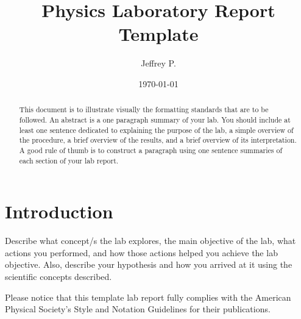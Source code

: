 \documentclass[
    10pt,aps,prl,
    amsfonts,
    amssymb,
    amsmath,
    runinaddress,
    secnum,
    showkeys,
    superscriptaddress,
    twocolumn,
]{revtex4}
\begin{document}

\title{Physics Laboratory Report Template}

\author{Jeffrey P. }


\date{\today}

%

\begin{abstract}
    This document is to illustrate visually the formatting standards that
        are to be followed.
    An abstract is a one paragraph summary of your lab.
    You should include at least one sentence dedicated to explaining
        the purpose of the lab, a simple overview of the procedure,
        a brief overview of the results, and a brief overview of
        its interpretation.
    A good rule of thumb is to construct a paragraph using one 
        sentence summaries of each section of your lab report.
\end{abstract}

\maketitle


\section{Introduction}
    \label{sec:intro}
    Describe what concept/s the lab explores, 
        the main objective of the lab, 
        what actions you performed, 
        and how those actions helped you achieve the lab objective.
    Also, describe your hypothesis and how you arrived 
        at it using the scientific concepts described.

    Please notice that this template lab report fully complies
        with the American Physical Society's Style and Notation
        Guidelines for their publications.
\end{document}
